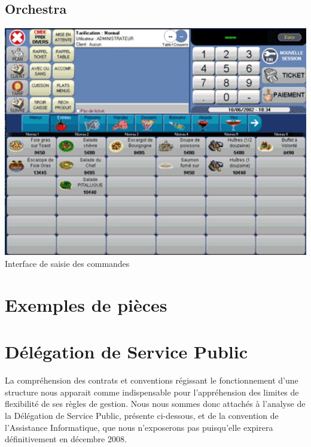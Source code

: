 \subsection{Orchestra}
\label{bar_orchestra}
\begin{center}
	\includegraphics[width=15cm]{annexes/images/bar_orchestra.png} \\
	Interface de saisie des commandes
\end{center}

\section{Exemples de pièces}


\section{Délégation de Service Public}

La compréhension des contrats et conventions régissant le fonctionnement d'une
structure nous apparait comme indispensable pour l'appréhension des limites de
flexibilité de ses règles de gestion. Nous nous sommes donc attachés à l'analyse
de la Délégation de Service Public, présente ci-dessous, et de la convention
de l'Assistance Informatique, que nous n'exposerons pas puisqu'elle expirera 
définitivement en décembre 2008.

\newpage

\begin{center}
	
\end{center}

